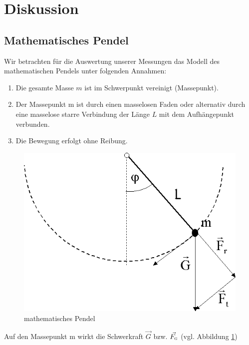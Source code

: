\documentclass[11pt,a4paper,titlepage, ngerman]{article}
\begin{document}
	\section{Diskussion}	
		\label{Diskussion}		
		
		\subsection{Mathematisches Pendel}
			
			Wir betrachten für die Auswertung unserer Messungen das Modell des mathematischen Pendels unter folgenden Annahmen:
			
			\begin{enumerate}
				\item Die gesamte Masse $m$ ist im Schwerpunkt vereinigt (Massepunkt).
				\item Der Massepunkt m ist durch einen masselosen Faden oder alternativ durch eine masselose starre Verbindung der Länge $L$ mit dem Aufhängepunkt verbunden.
				\item Die Bewegung erfolgt ohne Reibung.
			\end{enumerate}
			
			\begin{figure}[ht]
				\centering
				\includegraphics[scale=0.4]{mathematischesPendel.png}		
				\caption{mathematisches Pendel}
				\label{fig:matpendel}
			\end{figure}
			
			Auf den Massepunkt m wirkt die Schwerkraft $ \vec{G}$ bzw. $ \vec{F_\textsc{g}}$ (vgl. Abbildung \ref{fig:matpendel}) \\
			
\end{document}
